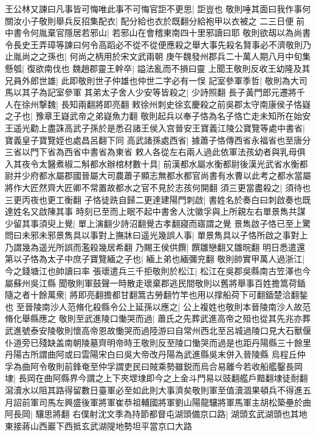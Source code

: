 王公林又諫曰凡事皆可悔唯此事不可悔官詎不更思|{
	詎豈也}
敬則唾其面曰我作事何關汝小子敬則舉兵反招集配衣|{
	配分給也衣於既翻分給袍甲以衣被之}
二三日便前中書令何胤棄官隱居若邪山|{
	若邪山在會稽東南四十里邪讀曰耶}
敬則欲刼以為尚書令長史王弄璋等諫曰何令高蹈必不從不從便應殺之舉大事先殺名賢事必不濟敬則乃止胤尚之之孫也|{
	何尚之柄用於宋文武兩朝}
庚午魏發州郡兵二十萬人期八月中旬集懸瓠|{
	復欲南伐也}
魏趙郡靈王幹卒|{
	謚法亂而不損曰靈}
上聞王敬則反收王幼隆及其兄員外郎世雄|{
	此即敬則世子仲雄也仲世二字必有一悮}
記室參軍季哲|{
	敬則為大司馬以其子為記室參軍}
其弟太子舍人少安等皆殺之|{
	少詩照翻}
長子黃門郎元遷將千人在徐州撃魏|{
	長知兩翻將即亮翻}
敕徐州刺史徐玄慶殺之前吳郡太守南康侯子恪嶷之子也|{
	豫章王嶷武帝之弟嶷魚力翻}
敬則起兵以奉子恪為名子恪亡走未知所在始安王遥光勸上盡誅高武子孫於是悉召諸王侯入宫晉安王寶義江陵公寶覽等處中書省|{
	寶義皇子寶覽姪也處昌呂翻下同}
高武諸孫處西省|{
	據蕭子恪傳西省永福省也至唐分三省以門下省為西省中書省為東省}
敕人各從左右兩人過此依軍法孩幼者與乳母俱入其夜令太醫煮椒二斛都水辦棺材數十具|{
	前漢都水屬水衡都尉後漢光武省水衡都尉并少府都水屬郡國晉屬大司農蕭子顯志無都水都官尚書有水曹以此考之都水當屬將作大匠然齊大匠卿不常置故都水之官不見於志孩何開翻}
須三更當盡殺之|{
	須待也三更丙夜也更工衡翻}
子恪徒跣自歸二更達建陽門刺啟|{
	書姓名於奏白曰刺啟奏也既達姓名又啟陳其事}
時刻已至而上眠不起中書舍人沈徽孚與上所親左右單景雋共謀少留其事須臾上覺|{
	單上演翻少詩沼翻覺古孝翻寢而寤謂之覺}
景雋啟子恪已至上驚問曰未邪未邪景雋具以事對上撫牀曰遥光幾誤人事|{
	單景雋具以子恪所啟之事對上乃謂幾為遥光所誤而濫殺幾居希翻}
乃賜王侯供饌|{
	饌雛戀翻又雛晥翻}
明日悉遣還第以子恪為太子中庶子寶覽緬之子也|{
	緬上弟也緬彌兖翻}
敬則帥實甲萬人過浙江|{
	今之錢塘江也帥讀曰率}
張瓌遣兵三千拒敬則於松江|{
	松江在吳郡吳縣南古笠澤也今屬蘇州吳江縣}
聞敬則軍鼓聲一時散走瓌棄郡逃民間敬則以舊將舉事百姓擔篙荷鍤隨之者十餘萬衆|{
	將即亮翻擔都甘翻篙古勞翻竹竿也用以撑船荷下可翻鍤楚洽翻鍫也}
至晉陵南沙人范脩化殺縣令公上延孫以應之|{
	公上複姓也敬則本晉陵南沙人故范脩化舉縣應之}
敬則至武進陵口慟哭而過|{
	蕭氏之先葬武進高帝之殂也從其先兆亦葬武進號泰安陵敬則懷高帝恩故慟哭而過陸游曰自常州西北至呂城過陵口見大石獸偃仆道旁已殘缺盖南朝陵墓齊明帝時王敬則反至陵口慟哭而過是也距丹陽縣三十餘里丹陽古所謂曲阿或曰雲陽宋白曰吳大帝改丹陽為武進縣吳末併入晉陵縣}
烏程丘仲孚為曲阿令敬則前鋒奄至仲孚謂吏民曰賊乘勢雖鋭而烏合易離今若收船艦鑿長岡埭|{
	長岡在曲阿縣界今謂之上下夾堽埭即今之上金斗門易以豉翻艦戶黯翻埭徒耐翻}
瀉瀆水以阻其路得留數日臺軍必至如此則大事濟矣敬則軍至值瀆涸果頓兵不得進五月詔前軍司馬左興盛後軍將軍崔恭祖輔國將軍劉山陽龍驤將軍馬軍主胡松築壘於曲阿長岡|{
	驤思將翻}
右僕射沈文季為持節都督屯湖頭備京口路|{
	湖頭玄武湖頭也其地東接蔣山西巖下西抵玄武湖隄地勢坦平當京口大路}
